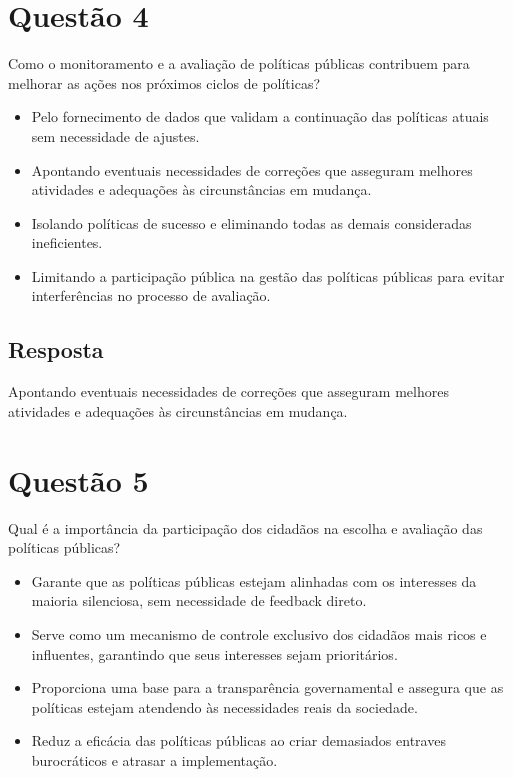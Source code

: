 \documentclass[
   article,       
   12pt,          
   oneside,       
   a4paper,       
   english,       
   brazil,        
   sumario=tradicional
   ]{abntex2}
\begin{document}
\section{Questão 4}
Como o monitoramento e a avaliação de políticas públicas contribuem para melhorar as ações nos próximos ciclos de políticas?

\begin{itemize}
  \item Pelo fornecimento de dados que validam a continuação das políticas atuais sem necessidade de ajustes.
  \item Apontando eventuais necessidades de correções que asseguram melhores atividades e adequações às circunstâncias em mudança.
  \item Isolando políticas de sucesso e eliminando todas as demais consideradas ineficientes.
  \item Limitando a participação pública na gestão das políticas públicas para evitar interferências no processo de avaliação.
\end{itemize}

\subsection{Resposta}
Apontando eventuais necessidades de correções que asseguram melhores atividades e adequações às circunstâncias em mudança.

\section{Questão 5}
Qual é a importância da participação dos cidadãos na escolha e avaliação das políticas públicas?

\begin{itemize}
  \item Garante que as políticas públicas estejam alinhadas com os interesses da maioria silenciosa, sem necessidade de feedback direto.
  \item Serve como um mecanismo de controle exclusivo dos cidadãos mais ricos e influentes, garantindo que seus interesses sejam prioritários.
  \item Proporciona uma base para a transparência governamental e assegura que as políticas estejam atendendo às necessidades reais da sociedade.
  \item Reduz a eficácia das políticas públicas ao criar demasiados entraves burocráticos e atrasar a implementação.
\end{itemize}
\end{document}
